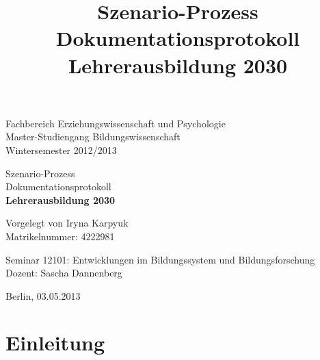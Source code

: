 \documentclass[12pt,a4paper]{article}
\author{}
\title{ Szenario-Prozess\\ Dokumentationsprotokoll\\ \textbf{Lehrerausbildung 2030} }
\begin{document}
\begin{titlepage}

\normalsize

\begin{flushleft}
Fachbereich Erziehungswissenschaft und Psychologie \\
Master-Studiengang Bildungswissenschaft \\
Wintersemester 2012/2013 \\
\end{flushleft}

\vspace{120pt}

\begin{center}
\huge
Szenario-Prozess\\ Dokumentationsprotokoll\\ \textbf{Lehrerausbildung 2030}
\vspace{60pt}
                         
\normalsize                               
Vorgelegt von Iryna Karpyuk\\
Matrikelnummer: 4222981
\end{center}                  
           
\begin{flushleft}
\normalsize
\vspace{100pt}

Seminar 12101: Entwicklungen im Bildungssystem und Bildungsforschung\\ 
Dozent: Sascha Dannenberg\\
\vspace{60pt}

Berlin, 03.05.2013
\end{flushleft}
\end{titlepage}
\normalsize                                              
\pagebreak

\tableofcontents

\pagebreak

\section{Einleitung}
\end{document}
